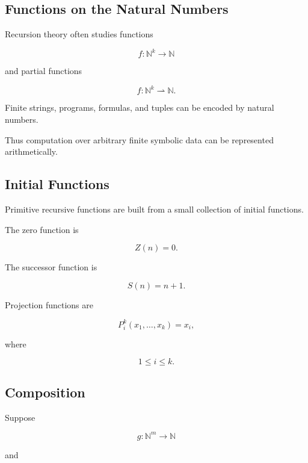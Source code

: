 \subsection{Functions on the Natural Numbers}
\label{subsec:recursive-functions-natural-numbers}

Recursion theory often studies functions

\[
\boxed{
f:\mathbb{N}^k\to\mathbb{N}
}
\]

and partial functions

\[
\boxed{
f:\mathbb{N}^k\rightharpoonup\mathbb{N}.
}
\]

Finite strings, programs, formulas, and tuples can be encoded by natural
numbers.

Thus computation over arbitrary finite symbolic data can be represented
arithmetically.

\subsection{Initial Functions}
\label{subsec:initial-recursive-functions}

Primitive recursive functions are built from a small collection of initial
functions.

The zero function is

\[
\boxed{
Z(n)=0.
}
\]

The successor function is

\[
\boxed{
S(n)=n+1.
}
\]

Projection functions are

\[
\boxed{
P_i^k(x_1,\ldots,x_k)=x_i,
}
\]

where

\[
1\leq i\leq k.
\]

\subsection{Composition}
\label{subsec:primitive-recursive-composition}

Suppose

\[
g:\mathbb{N}^m\to\mathbb{N}
\]

and

